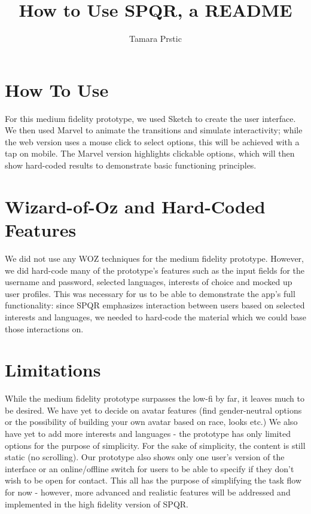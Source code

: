 \documentclass{article}
\title{How to Use SPQR, a README}
\author{Tamara Prstic}
\begin{document}
\maketitle

\section{How To Use}
For this medium fidelity prototype, we used Sketch to create the user interface. We then used Marvel to animate the transitions and simulate interactivity; while the web version uses a mouse click to select options, this will be achieved with a tap on mobile. The Marvel version highlights clickable options, which will then show hard-coded results to demonstrate basic functioning principles. 

\section{Wizard-of-Oz and Hard-Coded Features}
We did not use any WOZ techniques for the medium fidelity prototype. However, we did hard-code many of the prototype's features such as the input fields for the username and password, selected languages, interests of choice and mocked up user profiles. This was necessary for us to be able to demonstrate the app's full functionality: since SPQR emphasizes interaction between users based on selected interests and languages, we needed to hard-code the material which we could base those interactions on. 


\section{Limitations}
While the medium fidelity prototype surpasses the low-fi by far, it leaves much to be desired. We have yet to decide on avatar features (find gender-neutral options or the possibility of building your own avatar based on race, looks etc.) We also have yet to add more interests and languages - the prototype has only limited options for the purpose of simplicity. For the sake of simplicity, the content is still static (no scrolling). Our prototype also shows only one user's version of the interface or an online/offline switch for users to be able to specify if they don't wish to be open for contact. This all has the purpose of simplifying the task flow for now - however, more advanced and realistic features will be addressed and implemented in the high fidelity version of SPQR.
\end{document}
